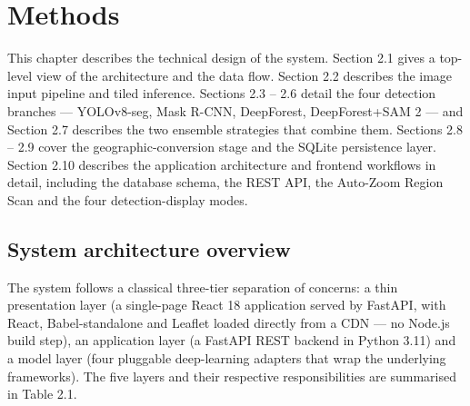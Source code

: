\chapter{Methods}\label{chapter-2.-methods}

This chapter describes the technical design of the system. Section 2.1 gives a top-level view of the architecture and the data flow. Section 2.2 describes the image input pipeline and tiled inference. Sections 2.3 -- 2.6 detail the four detection branches --- YOLOv8-seg, Mask R-CNN, DeepForest, DeepForest+SAM 2 --- and Section 2.7 describes the two ensemble strategies that combine them. Sections 2.8 -- 2.9 cover the geographic-conversion stage and the SQLite persistence layer. Section 2.10 describes the application architecture and frontend workflows in detail, including the database schema, the REST API, the Auto-Zoom Region Scan and the four detection-display modes.

\section{System architecture overview}\label{system-architecture-overview}

The system follows a classical three-tier separation of concerns: a thin presentation layer (a single-page React 18 application served by FastAPI, with React, Babel-standalone and Leaflet loaded directly from a CDN --- no Node.js build step), an application layer (a FastAPI REST backend in Python 3.11) and a model layer (four pluggable deep-learning adapters that wrap the underlying frameworks). The five layers and their respective responsibilities are summarised in Table 2.1.

